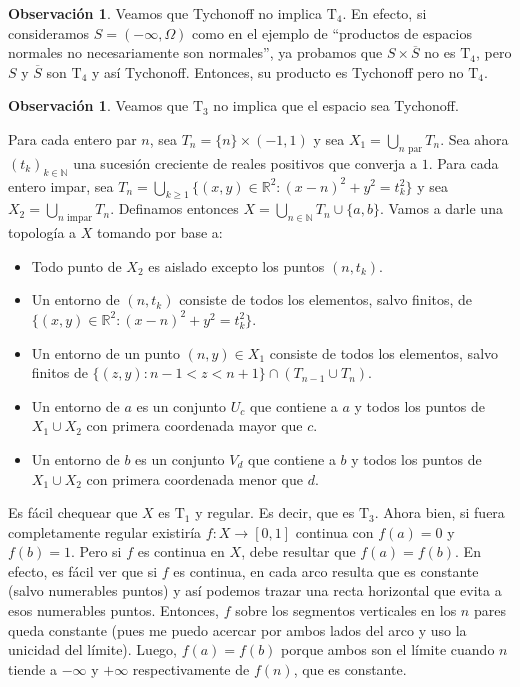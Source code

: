 \documentclass[12pt]{book}
\theoremstyle{definition}
\newtheorem{obs}[teo]{Observación}
\newcommand{\RR}{\mathbb{R}}      %
\newcommand{\NN}{\mathbb{N}}
\begin{document}
\begin{obs}
Veamos que Tychonoff no implica $\mathrm{T}_4$. En efecto, si consideramos $S=(-\infty,\Omega)$ como en el ejemplo de "`productos de espacios normales no necesariamente son normales"', ya probamos que $S\times\overline{S}$ no es $\mathrm{T}_4$, pero $S$ y $\overline{S}$ son $\mathrm{T}_4$ y así Tychonoff. Entonces, su producto es Tychonoff pero no $\mathrm{T}_4$.
\end{obs}

\begin{obs}
Veamos que $\mathrm{T}_3$ no implica que el espacio sea Tychonoff.

Para cada entero par $n$, sea $T_n = \{n\}\times (-1,1)$ y sea $X_1 = \displaystyle\bigcup_{n\text{ par}} T_n$. Sea ahora $(t_k)_{k\in\NN}$ una sucesión creciente de reales positivos que converja a $1$. Para cada entero impar, sea $T_n = \displaystyle\bigcup_{k\geq 1}\{(x,y)\in\RR^2 : (x-n)^2 + y^2 = t_k^2\}$ y sea $X_2 = \displaystyle\bigcup_{n\text{ impar}}T_n$. Definamos entonces $X= \displaystyle\bigcup_{n\in\NN}T_n \cup \{a,b\}$. Vamos a darle una topología a $X$ tomando por base a:
\begin{itemize}
\item Todo punto de $X_2$ es aislado excepto los puntos $(n,t_k)$.
\item Un entorno de $(n,t_k)$ consiste de todos los elementos, salvo finitos, de $\{(x,y)\in\RR^2 : (x-n)^2 + y^2 = t_k^2\}$.
\item Un entorno de un punto $(n,y)\in X_1$ consiste de todos los elementos, salvo finitos de $\{(z,y) : n-1 < z < n+1\}\cap (T_{n-1}\cup T_n)$.
\item Un entorno de $a$ es un conjunto $U_c$ que contiene a $a$ y todos los puntos de $X_1\cup X_2$ con primera coordenada mayor que $c$.
\item Un entorno de $b$ es un conjunto $V_d$ que contiene a $b$ y todos los puntos de $X_1\cup X_2$ con primera coordenada menor que $d$.
\end{itemize}

Es fácil chequear que $X$ es $\mathrm{T}_1$ y regular. Es decir, que es $\mathrm{T}_3$. Ahora bien, si fuera completamente regular existiría $f:X\to [0,1]$ continua con $f(a)=0$ y $f(b)=1$. Pero si $f$ es continua en $X$, debe resultar que $f(a)=f(b)$. En efecto, es fácil ver que si $f$ es continua, en cada arco resulta que es constante (salvo numerables puntos) y así podemos trazar una recta horizontal que evita a esos numerables puntos. Entonces, $f$ sobre los segmentos verticales en los $n$ pares queda constante (pues me puedo acercar por ambos lados del arco y uso la unicidad del límite). Luego, $f(a)=f(b)$ porque ambos son el límite cuando $n$ tiende a $-\infty$ y $+\infty$ respectivamente de $f(n)$, que es constante.

\end{obs}
\end{document}
